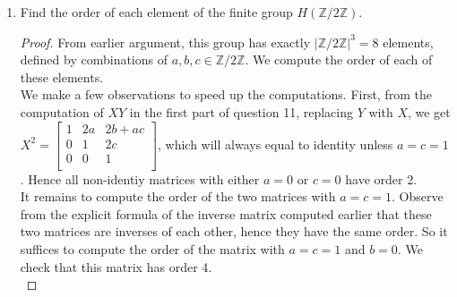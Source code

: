 \documentclass{article}
\begin{document}
\begin{enumerate}
\begin{enumerate}
\begin{enumerate}
\begin{proof}
              It remains to show that associativity holds for the element
              in row 1 column 3. Let $Z =
                \begin{bmatrix}
                  1 & g & h \\
                  0 & 1 & i \\
                  0 & 0 & 1 \\
                \end{bmatrix}$.
              Then for the element in the top right position, $(XY)Z$ gives
              $b+e+af+h+(a+d)i$, while $X(YZ)$ gives $b+(e+h+di)+a(f+i)$,
              which are equal. Hence multiplication is associative. \\

              Since $H(F)$ is closed, associative, contains the unit, and
              inverses, it is a group. The order of $H(F)$ is $|F|^3$, for
              each combination of the three variables $a,b,c\in F$. 
            \end{proof}
          \item Find the order of each element of the finite group
            $H(\mathbb{Z}/2\mathbb{Z})$.
            \begin{proof}
              From earlier argument, this group has exactly
              $|\mathbb{Z}/2\mathbb{Z}|^3=8$ elements, defined by
              combinations of $a,b,c\in\mathbb{Z}/2\mathbb{Z}$. We compute
              the order of each of these elements. \\
              
              We make a few observations to speed up the computations.
              First, from the computation of $XY$ in the first part of
              question 11, replacing $Y$ with $X$, we get $X^2 =
                \begin{bmatrix}
                  1 & 2a  & 2b+ac \\
                  0 & 1   & 2c \\
                  0 & 0   & 1 \\
                \end{bmatrix} $,
              which will always equal to identity unless $a=c=1$. Hence all
              non-identiy matrices with either $a=0$ or $c=0$ have order 2.
              \\

              It remains to compute the order of the two matrices with
              $a=c=1$. Observe from the explicit formula of the inverse
              matrix computed earlier that these two matrices are inverses
              of each other, hence they have the same order. So it suffices
              to compute the order of the matrix with $a=c=1$ and $b=0$. We
              check that this matrix has order 4. \\


\end{proof}
\end{enumerate}
\end{enumerate}
\end{enumerate}
\end{document}
